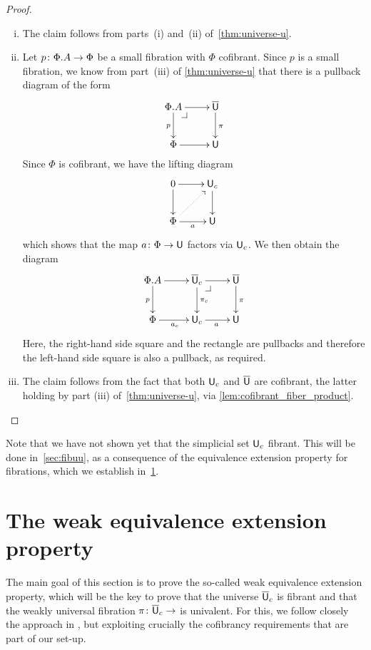 \documentclass[reqno,10pt,a4paper,oneside,draft]{amsart}
\begin{document}
\begin{proof} \hfill
\begin{enumerate}[(i)] 
\item The claim follows from parts~(i) and~(ii) of~\cref{thm:universe-u}. 
\item Let $p \colon \Phi.A \to \Phi$ be a small fibration with $\Phi$ cofibrant. Since $p$ is a
small fibration, we know 
from part~(iii) of \cref{thm:universe-u} that there is a pullback diagram of the form 
\[
\xymatrix{
\Phi.A \ar[r] \ar[d]_p \drpullback & \UU \ar[d]^{\pi} \\
\Phi \ar[r] & \U }
\]
Since $\Phi$ is cofibrant, we have the lifting diagram
\[
\xymatrix{
0 \ar[r] \ar[d] & \U_c \ar[d]^{} \\
\Phi \ar[r]_a \ar@{.>}[ur] & \U }
\]
which shows that the map $a \colon \Phi \to \mathsf{U}$ factors via $\mathsf{U}_c$.  We then obtain the diagram
\[
\xymatrix{
\Phi.A \ar[r] \ar[d]_p &  \UU_c \ar[r]  \ar[d]^{\pi_c} \drpullback & \UU \ar[d]^{\pi} \\
\Phi \ar[r]_{a_c} & \U_c \ar[r]_{a} &  \U }
\]
Here, the right-hand side square and the rectangle are pullbacks and therefore the left-hand
side square is also a pullback, as required. 
\item The claim follows from the fact that both $\mathsf{U}_c$ and
$\overline{\mathsf{U}}$ are cofibrant, the latter holding by part (iii) of~\cref{thm:universe-u}, via \cref{lem:cofibrant_fiber_product}. \qedhere
\end{enumerate} 
\end{proof} 





Note that we have not shown yet that the simplicial set $\mathsf{U}_c$ fibrant. This will be done in~\cref{sec:fibuu}, as a consequence of the equivalence extension property for fibrations, which we establish in~\cref{sec:equep}.

\newpage


\section{The weak equivalence extension property}
\label{sec:equep}

The main goal of this section is to prove the so-called weak equivalence extension property, which will be the key to prove that the universe $\overline{\mathsf{U}}_c$ is fibrant and that the weakly universal fibration $\pi \colon \overline{\mathsf{U}}_c \to $ is univalent.  For this, we follow closely the approach in \cite{voevodsky-simplicial-model}, but exploiting crucially the cofibrancy requirements that are part of our set-up.
\end{document}
